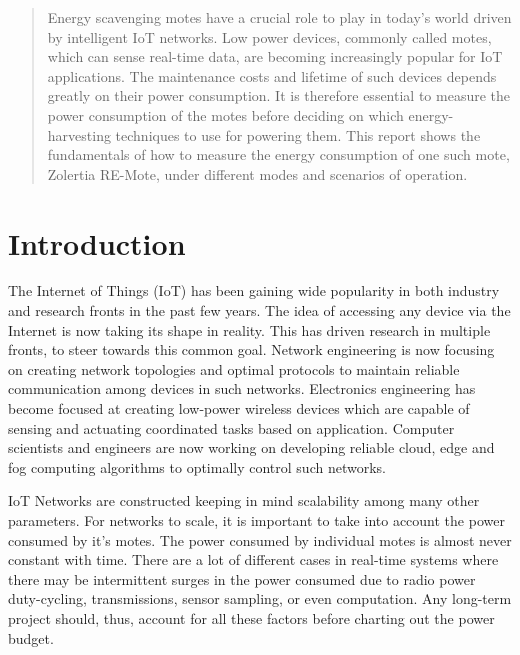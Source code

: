 \documentclass[a4paper]{article}
\author{Srijith Nair}
\date{\today}
\begin{document}
\maketitle

\begin{abstract}
Energy scavenging motes have a crucial role to play in today's world driven by intelligent IoT networks. Low power devices, commonly called motes, which can sense real-time data, are becoming increasingly popular for IoT applications. The maintenance costs and lifetime of such devices depends greatly on their power consumption. It is therefore essential to measure the power consumption of the motes before deciding on which energy-harvesting techniques to use for powering them. This report shows the fundamentals of how to measure the energy consumption of one such mote, Zolertia RE-Mote, under different modes and scenarios of operation.
\end{abstract}

\section{Introduction}
\label{sec:introduction}
The Internet of Things (IoT) has been gaining wide popularity in both industry and research fronts in the past few years. The idea of accessing any device via the Internet is now taking its shape in reality. This has driven research in multiple fronts, to steer towards this common goal. Network engineering is now focusing on creating network topologies and optimal protocols to maintain reliable communication among devices in such networks. Electronics engineering has become focused at creating low-power wireless devices which are capable of sensing and actuating coordinated tasks based on application. Computer scientists and engineers are now working on developing reliable cloud, edge and fog computing algorithms to optimally control such networks.

IoT Networks are constructed keeping in mind scalability among many other parameters. For networks to scale, it is important to take into account the power consumed by it's motes. The power consumed by individual motes is almost never constant with time. There are a lot of different cases in real-time systems where there may be intermittent surges in the power consumed due to radio power duty-cycling, transmissions, sensor sampling, or even computation. Any long-term project should, thus, account for all these factors before charting out the power budget.
\end{document}
